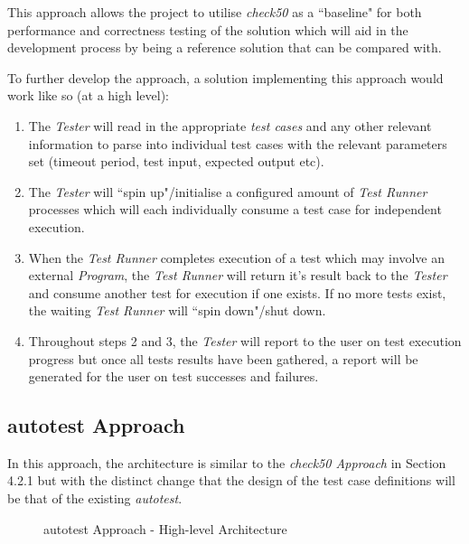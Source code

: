 \documentclass[hidelinks, 12pt]{extreport}
\begin{document}
This approach allows the project to utilise \textit{check50} as a ``baseline" for both performance and correctness testing of the solution which will aid in the development process by being a reference solution that can be compared with.

To further develop the approach, a solution implementing this approach would work like so (at a high level):
\begin{enumerate}
	\item The \textit{Tester} will read in the appropriate \textit{test cases} and any other relevant information to parse into individual test cases with the relevant parameters set (timeout period, test input, expected output etc).
	\item The \textit{Tester} will ``spin up"/initialise a configured amount of \textit{Test Runner} processes which will each individually consume a test case for independent execution.
	\item When the \textit{Test Runner} completes execution of a test which may involve an external \textit{Program}, the \textit{Test Runner} will return it's result back to the \textit{Tester} and consume another test for execution if one exists. If no more tests exist, the waiting \textit{Test Runner} will ``spin down"/shut down.
	\item Throughout steps 2 and 3, the \textit{Tester} will report to the user on test execution progress but once all tests results have been gathered, a report will be generated for the user on test successes and failures.
\end{enumerate}

\subsection{autotest Approach}

In this approach, the architecture is similar to the \textit{check50 Approach} in Section 4.2.1 but with the distinct change that the design of the test case definitions will be that of the existing \textit{autotest}.

\begin{figure}[h]
	\centering
	\caption{autotest Approach - High-level Architecture}
	\label{fig:approach2-1}
\end{figure}
\end{document}
